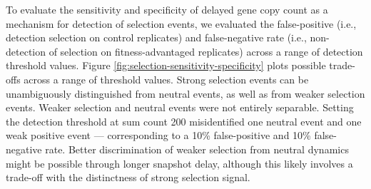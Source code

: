 


To evaluate the sensitivity and specificity of delayed gene copy count as a mechanism for detection of selection events, we evaluated the false-positive (i.e., detection selection on control replicates) and false-negative rate (i.e., non-detection of selection on fitness-advantaged replicates) across a range of detection threshold values.
Figure \ref{fig:selection-sensitivity-specificity} plots possible trade-offs across a range of threshold values.
Strong selection events can be unambiguously distinguished from neutral events, as well as from weaker selection events.
Weaker selection and neutral events were not entirely separable.
Setting the detection threshold at sum count 200 misidentified one neutral event and one weak positive event --- corresponding to a 10\% false-positive and 10\% false-negative rate.
Better discrimination of weaker selection from neutral dynamics might be possible through longer snapshot delay, although this likely involves a trade-off with the distinctness of strong selection signal.
